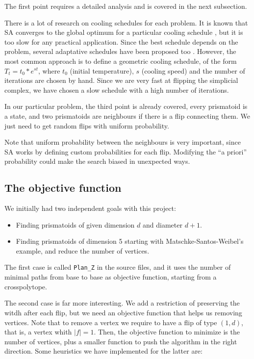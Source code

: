\documentclass[12pt,a4paper]{article}
\theoremstyle{plain}
\theoremstyle{definition}
\begin{document}
The first point requires a detailed analysis and is covered in the next subsection.

There is a lot of research on cooling schedules for each problem. It is known that SA converges to the global optimum for a particular cooling schedule \cite{optimumSA}, but it is too slow for any practical application. Since the best schedule depends on the problem, several adaptative schedules have been proposed too \cite{adaptativeSA}. However, the most common approach is to define a geometric cooling schedule, of the form $T_t=t_0*e^{st}$, where $t_0$ (initial temperature), $s$ (cooling speed) and the number of iterations are chosen by hand. Since we are very fast at flipping the simplicial complex, we have chosen a slow schedule with a high number of iterations.

In our particular problem, the third point is already covered, every prismatoid is a state, and two prismatoids are neighbours if there is a flip connecting them. We just need to get random flips with uniform probability.

Note that uniform probability between the neighbours is very important, since SA works by defining custom probabilities for each flip. Modifying the ``a priori'' probability could make the search biased in unexpected ways.

\subsection{The objective function}

We initially had two independent goals with this project:

\begin{itemize}
  \item Finding prismatoids of given dimension $d$ and diameter $d+1$.
  \item Finding prismatoids of dimension 5 starting with Matschke-Santos-Weibel's example, and reduce the number of vertices.
\end{itemize}

The first case is called \lstinline{Plan_Z} in the source files, and it uses the number of minimal paths from base to base as objective function, starting from a crosspolytope.

The second case is far more interesting. We add a restriction of preserving the witdh after each flip, but we need an objective function that helps us removing vertices. Note that to remove a vertex we require to have a flip of type $(1,d)$, that is, a vertex whith $|f|=1$. 
Then, the objective function to minimize is the number of vertices, plus a smaller function to push the algorithm in the right direction. Some heuristics we have implemented for the latter are:
\end{document}
